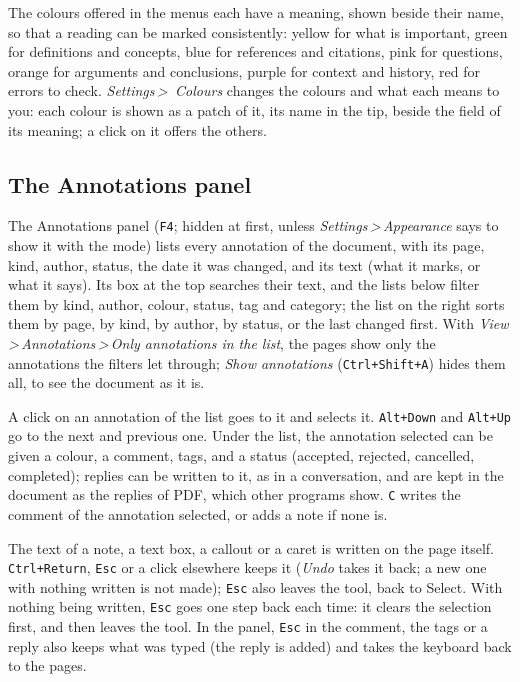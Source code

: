 \documentclass[12pt,
              article,
              oneside
              ]{memoir}
\newcommand*{\menu}[1]{\textit{#1}}
\newcommand*{\then}{\,>\,}
\newcommand*{\key}[1]{\texttt{#1}}
\begin{document}
%
The colours offered in the menus each have a meaning, shown beside their
name, so that a reading can be marked consistently: yellow for what is
important, green for definitions and concepts, blue for references and
citations, pink for questions, orange for arguments and conclusions, purple
for context and history, red for errors to check. \menu{Settings\then
Colours} changes the colours and what each means to you: each colour is
shown as a patch of it, its name in the tip, beside the field of its
meaning; a click on it offers the others.

\subsection{The Annotations panel}

%
The Annotations panel (\key{F4}; hidden at first, unless
\menu{Settings\then Appearance} says to show it with the mode) lists every
annotation of the document, with its page, kind, author, status, the date it was changed, and
its text (what it marks, or what it says). Its box at the top searches their
text, and the lists below filter them by kind, author, colour, status, tag
and category; the list on the right sorts them by page, by kind, by author,
by status, or the last changed first. With \menu{View\then Annotations\then Only annotations in the list},
the pages show only the annotations the filters let through;
\menu{Show annotations} (\key{Ctrl+Shift+A}) hides them all, to see the
document as it is.

%
A click on an annotation of the list goes to it and selects it.
\key{Alt+Down} and \key{Alt+Up} go to the next and previous one. Under the
list, the annotation selected can be given a colour, a comment, tags, and a
status (accepted, rejected, cancelled, completed); replies can be written
to it, as in a conversation, and are kept in the document as the replies of
PDF, which other programs show. \key{C} writes the comment of the
annotation selected, or adds a note if none is.

%
The text of a note, a text box, a callout or a caret is written on the
page itself. \key{Ctrl+Return}, \key{Esc} or a click elsewhere keeps it
(\menu{Undo} takes it back; a new one with nothing written is not made);
\key{Esc} also leaves the tool, back to Select. With nothing being
written, \key{Esc} goes one step back each time: it clears the selection
first, and then leaves the tool. In the panel, \key{Esc} in the comment, the
tags or a reply also keeps what was typed (the reply is added) and takes
the keyboard back to the pages.
\end{document}
